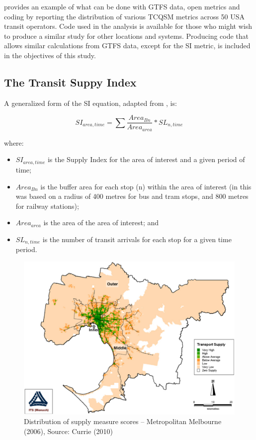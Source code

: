 \documentclass[preprint, 3p,
authoryear]{elsarticle} %
\begin{document}
\citet{Wong:2013aa} provides an example of what can be done with GTFS
data, open metrics and coding by reporting the distribution of various
TCQSM metrics across 50 USA transit operators. Code used in the
\citet{Wong:2013aa} analysis is available for those who might wish to
produce a similar study for other locations and systems. Producing code
that allows similar calculations from GTFS data, except for the SI
metric, is included in the objectives of this study.

\subsection{The Transit Suppy Index}\label{the-transit-suppy-index}

A generalized form of the SI equation, adapted from
\citet{currie2010identifying}, is:

\[SI_{area, time} = \sum{\frac{Area_{Bn}}{Area_{area}}*SL_{n, time}}\]

where:

\begin{itemize}
\item
  \(SI_{area, time}\) is the Supply Index for the area of interest and a
  given period of time;
\item
  \(Area_{Bn}\) is the buffer area for each stop (n) within the area of
  interest (in \citet{currie2010identifying} this was based on a radius
  of 400 metres for bus and tram stops, and 800 metres for railway
  stations);
\item
  \(Area_{area}\) is the area of the area of interest; and
\item
  \(SL_{n,time}\) is the number of transit arrivals for each stop for a
  given time period.
\end{itemize}

\begin{figure}
\includegraphics[width=1\linewidth]{graphics/Currie2010SI} \caption{Distribution of supply measure scores – Metropolitan Melbourne (2006), Source: Currie (2010)}\label{fig:Currie_map_SI}
\end{figure}
\end{document}
